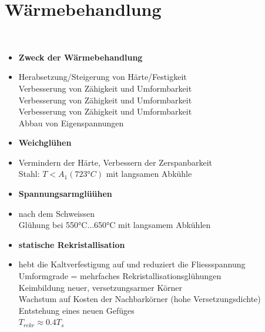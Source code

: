 \documentclass[12pt,twocolumn]{article}
\begin{document}
    \section{Wärmebehandlung}\mbox{}\\
    \begin{minipage}[t]{1\columnwidth}
        \begin{itemize}[label={}, leftmargin=*,  itemsep=0.01em]
            \item \textbf{Zweck der Wärmebehandlung} 
            \item Herabsetzung/Steigerung von Härte/Festigkeit \\ Verbesserung von Zähigkeit und Umformbarkeit \\ Verbesserung von Zähigkeit und Umformbarkeit \\ Verbesserung von Zähigkeit und Umformbarkeit \\ Abbau von Eigenspannungen
        \end{itemize} 
    \end{minipage}\hfill
    \begin{minipage}[t]{0.5\columnwidth}
        \begin{itemize}[label={}, leftmargin=*,  itemsep=0.01em]
            \item \textbf{Weichglühen} 
            \item Vermindern der Härte, Verbessern der Zerspanbarkeit \\ Stahl: $T < A_1 (723°C)$ mit langsamen Abkühle
        \end{itemize} 
    \end{minipage}\hfill
    \begin{minipage}[t]{0.5\columnwidth}
        \begin{itemize}[label={}, leftmargin=*,  itemsep=0.01em]
            \item \textbf{Spannungsarmglüühen} 
            \item nach dem Schweissen \\ Glühung bei 550°C...650°C mit langsamem Abkühlen \\ 
        \end{itemize} 
    \end{minipage}\hfill
    \begin{minipage}[t]{1\columnwidth}
        \begin{itemize}[label={}, leftmargin=*,  itemsep=0.01em]
            \item \textbf{statische Rekristallisation} 
            \item hebt die Kaltverfestigung auf und reduziert die Fliessspannung \\ Umformgrade = mehrfaches Rekristallisationsglühungen \\ Keimbildung neuer, versetzungsarmer Körner \\ Wachstum auf Kosten der Nachbarkörner (hohe Versetzungsdichte) \\ Entstehung eines neuen Gefüges \\ $T_{rekr} \approx 0.4T_s$
        \end{itemize}
    \end{minipage}
\end{document}
